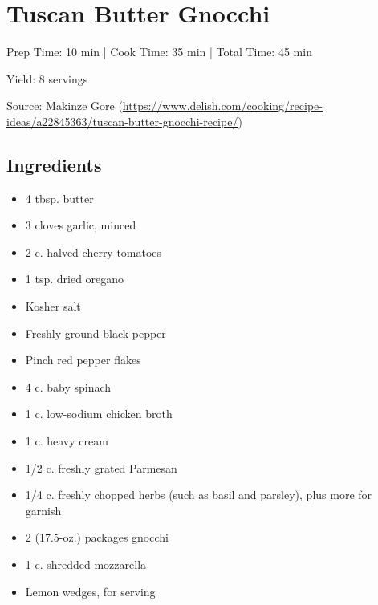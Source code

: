 \section{Tuscan Butter Gnocchi}

\begin{center}
Prep Time: 10 min |
Cook Time: 35 min |
Total Time: 45 min

\noindent Yield: 8 servings

\vspace{1em}

    Source: Makinze Gore (\url{https://www.delish.com/cooking/recipe-ideas/a22845363/tuscan-butter-gnocchi-recipe/})
\end{center}

\subsection{Ingredients}
\begin{multicols}{2}
\begin{itemize}
  \item 4 tbsp. butter
  \item 3 cloves garlic, minced
  \item 2 c. halved cherry tomatoes 
  \item 1 tsp. dried oregano 
  \item Kosher salt 
  \item Freshly ground black pepper
  \item Pinch red pepper flakes 
  \item 4 c. baby spinach 
  \item 1 c. low-sodium chicken broth
  \item 1 c. heavy cream 
  \item 1/2 c. freshly grated Parmesan 
  \item 1/4 c. freshly chopped herbs (such as basil and parsley), plus more for garnish 
  \item 2 (17.5-oz.) packages gnocchi
  \item 1 c. shredded mozzarella
  \item Lemon wedges, for serving
\end{itemize}
\end{multicols}

